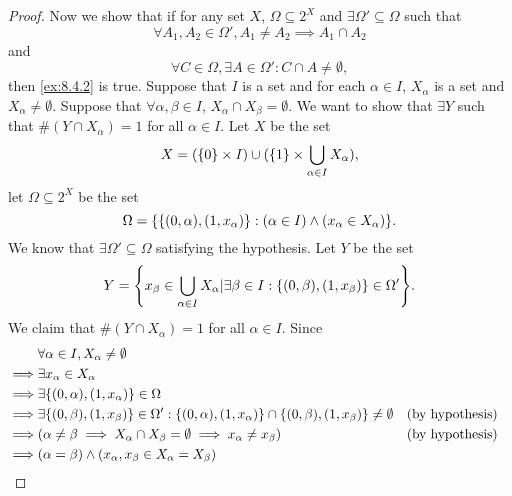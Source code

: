 \begin{proof}
  Now we show that if for any set \(X\), \(\Omega \subseteq 2^X\) and \(\exists \Omega' \subseteq \Omega\) such that
  \[
    \forall A_1, A_2 \in \Omega', A_1 \neq A_2 \implies A_1 \cap A_2
  \]
  and
  \[
    \forall C \in \Omega, \exists A \in \Omega' : C \cap A \neq \emptyset,
  \]
  then \cref{ex:8.4.2} is true.
  Suppose that \(I\) is a set and for each \(\alpha \in I\), \(X_{\alpha}\) is a set and \(X_{\alpha} \neq \emptyset\).
  Suppose that \(\forall \alpha, \beta \in I\), \(X_{\alpha} \cap X_{\beta} = \emptyset\).
  We want to show that \(\exists Y\) such that \(\#(Y \cap X_{\alpha}) = 1\) for all \(\alpha \in I\).
  Let \(X\) be the set
  \[
    X = (\left\lbrace0\right\rbrace \times I) \cup (\left\lbrace1\right\rbrace \times \bigcup_{\alpha \in I} X_{\alpha}),
  \]
  let \(\Omega \subseteq 2^X\) be the set
  \[
    \Omega = \set{\set{(0, \alpha), (1, x_{\alpha})} : (\alpha \in I) \land (x_{\alpha} \in X_{\alpha})}.
  \]
  We know that \(\exists \Omega' \subseteq \Omega\) satisfying the hypothesis.
  Let \(Y\) be the set
  \[
    Y = \set{x_{\beta} \in \bigcup_{\alpha \in I} X_{\alpha} | \exists \beta \in I : \set{(0, \beta), (1, x_{\beta})} \in \Omega'}.
  \]
  We claim that \(\#(Y \cap X_{\alpha}) = 1\) for all \(\alpha \in I\).
  Since
  \begin{align*}
             & \forall \alpha \in I, X_{\alpha} \neq \emptyset                                                                                                                            \\
    \implies & \exists x_{\alpha} \in X_{\alpha}                                                                                                                                          \\
    \implies & \exists \set{(0, \alpha), (1, x_{\alpha})} \in \Omega                                                                                                                      \\
    \implies & \exists \set{(0, \beta), (1, x_{\beta})} \in \Omega' : \set{(0, \alpha), (1, x_{\alpha})} \cap \set{(0, \beta), (1, x_{\beta})} \neq \emptyset &  & \text{(by hypothesis)} \\
    \implies & (\alpha \neq \beta \implies X_{\alpha} \cap X_{\beta} = \emptyset \implies x_{\alpha} \neq x_{\beta})                                          &  & \text{(by hypothesis)} \\
    \implies & (\alpha = \beta) \land (x_{\alpha}, x_{\beta} \in X_{\alpha} = X_{\beta})                                                                                                  \\

\end{align*}
\end{proof}
